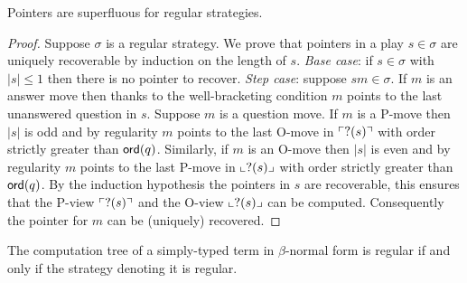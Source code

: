 \begin{lem}
\label{lem:regular_pointers_uniqu_recover}
Pointers are superfluous for regular strategies.
\end{lem}
\begin{proof}
Suppose $\sigma$ is a regular strategy. We prove that pointers in a play $s\in \sigma$ are uniquely recoverable by induction on the length of $s$.
\noindent \emph{Base case}: if $s \in \sigma$ with $|s| \leq 1$ then there is no pointer to recover.
\noindent \emph{Step case}: suppose $s m \in \sigma$. If $m$ is an answer move then
thanks to the well-bracketing condition $m$ points to the last unanswered question in $s$.
Suppose $m$ is a question move.
If $m$ is a P-move then $|s|$ is odd and by regularity
$m$ points to the last O-move in $\ulcorner ?(s) \urcorner$ with order strictly greater than ${\sf ord}(q)$.
Similarly, if $m$ is an O-move then $|s|$ is even and by regularity
$m$ points to the last P-move in $\llcorner ?(s) \lrcorner$ with order strictly greater than ${\sf ord}(q)$.
By the induction hypothesis the pointers in $s$ are recoverable, this ensures that the
P-view $\ulcorner ?(s) \urcorner$ and the O-view $\llcorner ?(s) \lrcorner$ can be computed. Consequently the pointer for $m$ can be (uniquely) recovered.
\end{proof}

\begin{prop}
\label{prop:regular_comp_imp_regular_strat}
The computation tree of a simply-typed term in $\beta$-normal form is regular if and only if the strategy denoting it is regular.
\end{prop}

